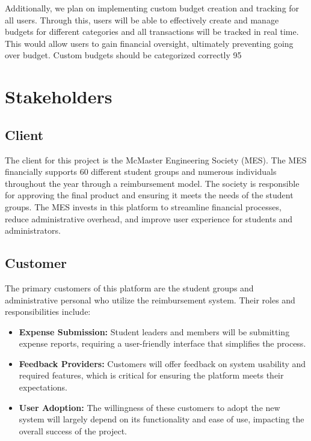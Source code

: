 \documentclass[12pt]{article}
\begin{document}
Additionally, we plan on implementing custom budget creation and tracking for all users. Through this, users will be able to effectively create and manage budgets for different categories and all transactions will be tracked in real time. This would allow users to gain financial oversight, ultimately preventing going over budget. Custom budgets should be categorized correctly 95%

\section{Stakeholders}
\subsection{Client}
The client for this project is the McMaster Engineering Society (MES). The MES financially supports 60 different student groups and numerous individuals throughout the year through a reimbursement model. The society is responsible for approving the final product and ensuring it meets the needs of the student groups.
The MES invests in this platform to streamline financial processes, reduce administrative overhead, and improve user experience for students and administrators.

\subsection{Customer}
The primary customers of this platform are the student groups and administrative personal who utilize the reimbursement system. Their roles and responsibilities include:
\begin{itemize}
    \item \textbf{Expense Submission:} Student leaders and members will be submitting expense reports, requiring a user-friendly interface that simplifies the process.
    \item \textbf{Feedback Providers:} Customers will offer feedback on system usability and required features, which is critical for ensuring the platform meets their expectations.
    \item \textbf{User Adoption:} The willingness of these customers to adopt the new system will largely depend on its functionality and ease of use, impacting the overall success of the project.
\end{itemize}
\end{document}
